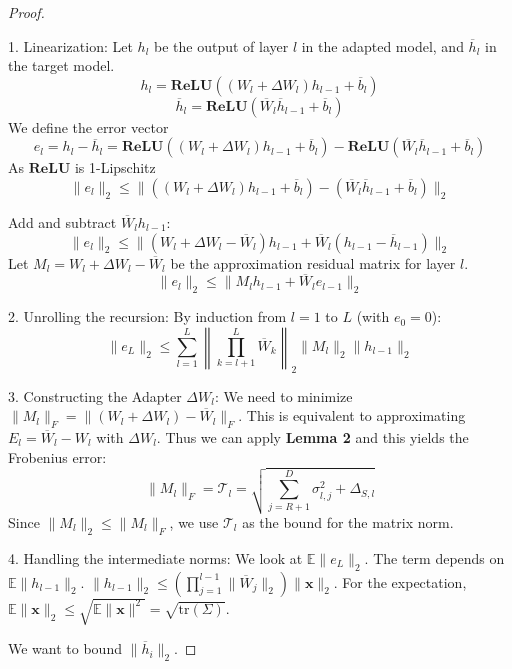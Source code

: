 \documentclass[a4paper,14pt]{extarticle}
\begin{document}
    \begin{proof}$~$

        1.  Linearization:
            Let $h_l$ be the output of layer $l$ in the adapted model, and $\overline{h}_l$ in the target model.
            $$ h_l = \mathbf{ReLU}((W_l + \Delta W_l) h_{l-1} + \overline{b}_l) $$
            $$ \overline{h}_l = \mathbf{ReLU}(\overline{W}_l \overline{h}_{l-1} + \overline{b}_l) $$
            We define the error vector 
            $$e_l = h_l - \overline{h}_l = \mathbf{ReLU}((W_l + \Delta W_l) h_{l-1}+ \overline{b}_l) - \mathbf{ReLU}(\overline{W}_l \overline{h}_{l-1} + \overline{b}_l) $$
            As $\mathbf{ReLU}$ is 1-Lipschitz
            $$\|e_l\|_2 \leqslant \| ((W_l + \Delta W_l) h_{l-1}+ \overline{b}_l) - (\overline{W}_l \overline{h}_{l-1} + \overline{b}_l)\|_2 $$

            Add and subtract $\overline{W}_l h_{l-1}$:
            $$ \|e_l\|_2 \leqslant \|(W_l + \Delta W_l - \overline{W}_l) h_{l-1} + \overline{W}_l (h_{l-1} - \overline{h}_{l-1})\|_2 $$
            Let $M_l = W_l + \Delta W_l - \overline{W}_l$ be the approximation residual matrix for layer $l$.
            $$ \|e_l\|_2 \leqslant \|M_l h_{l-1} + \overline{W}_l e_{l-1}\|_2 $$
            

        2.  Unrolling the recursion:
            By induction from $l=1$ to $L$ (with $e_0 = 0$):
            $$ \|e_L\|_2 \leqslant \sum_{l=1}^L \left\| \prod_{k=l+1}^L \overline{W}_k \right\|_2 \| M_l \|_2 \| h_{l-1} \|_2 $$

        3.  Constructing the Adapter $\Delta W_l$:
            We need to minimize $\| M_l \|_F = \| (W_l + \Delta W_l) - \overline{W}_l \|_F$.
            This is equivalent to approximating $E_l = \overline{W}_l - W_l$ with $\Delta W_l$.
            Thus we can apply \textbf{Lemma 2} and this yields the Frobenius error:
            $$ \| M_l \|_F = \mathcal{T}_l = \sqrt{ \sum_{j=R+1}^D \sigma_{l,j}^2 + \Delta_{S,l} } $$
            Since $\|M_l\|_2 \leqslant \|M_l\|_F$, we use $\mathcal{T}_l$ as the bound for the matrix norm.

        4.  Handling the intermediate norms:
            We look at $\mathbb{E} \|e_L\|_2$.
            The term depends on $\mathbb{E} \|h_{l-1}\|_2$. $\|h_{l-1}\|_2 \leqslant (\prod_{j=1}^{l-1} \|\overline{W}_j\|_2) \|\mathbf{x}\|_2$.
            For the expectation, $\mathbb{E}\|\mathbf{x}\|_2 \leqslant \sqrt{\mathbb{E}\|\mathbf{x}\|^2} = \sqrt{\text{tr}(\Sigma)}$.

            We want to bound $\| \overline{h}_i \|_2$.


\end{proof}
\end{document}

